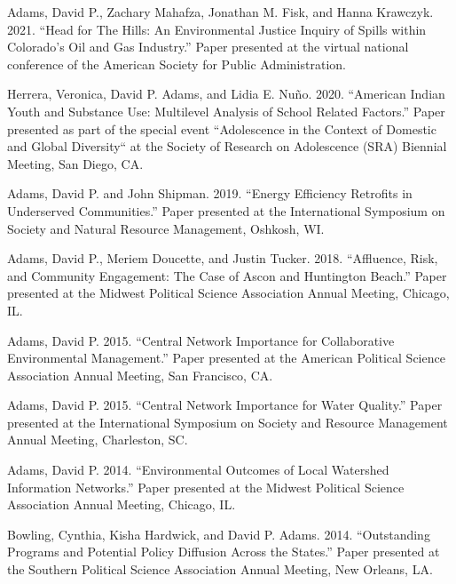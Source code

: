 \documentclass[12pt,letterpaper]{article}
\renewenvironment{itemize}{
  \begin{list}{}{
    \setlength{\leftmargin}{1.5em}
    \setlength{\itemsep}{0.25em}
    \setlength{\parskip}{0pt}
    \setlength{\parsep}{0.25em}
  }
}{
  \end{list}
}
\begin{document}
\begin{itemize}
    \item Adams, David P., Zachary Mahafza, Jonathan M. Fisk, and Hanna Krawczyk. 2021. ``Head for The Hills: An Environmental Justice Inquiry of Spills within Colorado's Oil and Gas Industry.'' Paper presented at the virtual national conference of the American Society for Public Administration.

    \item Herrera, Veronica, David P. Adams, and Lidia E. Nuño. 2020. ``American Indian Youth and Substance Use: Multilevel Analysis of School Related Factors.'' Paper presented as part of the special event ``Adolescence in the Context of Domestic and Global Diversity`` at the Society of Research on Adolescence (SRA) Biennial Meeting, San Diego, CA.
    
    \item Adams, David P. and John Shipman. 2019. ``Energy Efficiency Retrofits in Underserved Communities.'' Paper presented at the International Symposium on Society and Natural Resource Management, Oshkosh, WI.
    
    \item Adams, David P., Meriem Doucette, and Justin Tucker. 2018. ``Affluence, Risk, and Community Engagement: The Case of Ascon and Huntington Beach.'' Paper presented at the Midwest Political Science Association Annual Meeting, Chicago, IL.
    
    \item Adams, David P. 2015. ``Central Network Importance for Collaborative Environmental Management.'' Paper presented at the American Political Science Association Annual Meeting, San Francisco, CA.
    
    \item Adams, David P. 2015. ``Central Network Importance for Water Quality.'' Paper presented at the International Symposium on Society and Resource Management Annual Meeting, Charleston, SC.
    
    \item Adams, David P. 2014. ``Environmental Outcomes of Local Watershed Information Networks.'' Paper presented at the Midwest Political Science Association Annual Meeting, Chicago, IL.
    
    \item Bowling, Cynthia, Kisha Hardwick, and David P. Adams. 2014. ``Outstanding Programs and Potential Policy Diffusion Across the States.'' Paper presented at the Southern Political Science Association Annual Meeting, New Orleans, LA.
    

\end{itemize}
\end{document}

